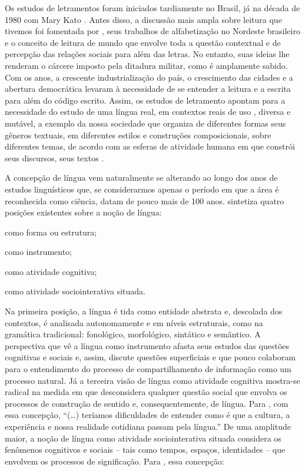 \documentclass{textolivre}
\begin{document}
Os estudos de letramentos foram iniciados tardiamente no Brasil, já na década de 1980 com Mary Kato \cite{soares_letramento_1998}. Antes disso, a discussão mais ampla sobre leitura que tivemos foi fomentada por \textcite{freire_importancia_2011}, seus trabalhos de alfabetização no Nordeste brasileiro e o conceito de leitura de mundo que envolve toda a questão contextual e de percepção das relações sociais para além das letras. No entanto, suas ideias lhe renderam o cárcere imposto pela ditadura militar, como é amplamente sabido. Com os anos, a crescente industrialização do país, o crescimento das cidades e a abertura democrática levaram à necessidade de se entender a leitura e a escrita para além do código escrito. Assim, os estudos de letramento apontam para a necessidade do estudo de uma língua real, em contextos reais de uso \cite{marcuschi_da_2001, marcuschi_producao_2008, soares_letramento_1998, street_letramentos_2014}, diversa e mutável, a exemplo da nossa sociedade que organiza de diferentes formas seus gêneros textuais, em diferentes estilos e construções composicionais, sobre diferentes temas, de acordo com as esferas de atividade humana em que constrói seus discursos, seus textos \cite{bakhtin_speech_1986, bakhtin_marxismo_2006}.

A concepção de língua vem naturalmente se alterando ao longo dos anos de estudos linguísticos que, se considerarmos apenas o período em que a área é reconhecida como ciência, datam de pouco mais de 100 anos. \textcite{marcuschi_producao_2008} sintetiza quatro posições existentes sobre a noção de língua:
\begin{enumerate*}[label={(\alph*)}] 
\item como forma ou estrutura; 
\item como instrumento; 
\item como atividade cognitiva; 
\item como atividade sociointerativa situada. 
\end{enumerate*} 
Na primeira posição, a língua é tida como entidade abstrata e, descolada dos contextos, é analisada autonomamente e em níveis estruturais, como na gramática tradicional: fonológico, morfológico, sintático e semântico. A perspectiva que vê a língua como instrumento afasta seus estudos das questões cognitivas e sociais e, assim, discute questões superficiais e que pouco colaboram para o entendimento do processo de compartilhamento de informação como um processo natural. Já a terceira visão de língua como atividade cognitiva mostra-se radical na medida em que desconsidera qualquer questão social que envolva os processos de construção de sentido e, consequentemente, de língua. Para \textcite[p. 60]{marcuschi_producao_2008}, com essa concepção, “(\ldots) teríamos dificuldades de entender como é que a cultura, a experiência e nossa realidade cotidiana passam pela língua.” De uma amplitude maior, a noção de língua como atividade sociointerativa situada considera os fenômenos cognitivos e sociais – tais como tempos, espaços, identidades – que envolvem os processos de significação. Para \textcite[p. 60]{marcuschi_producao_2008}, essa concepção:
\end{document}

